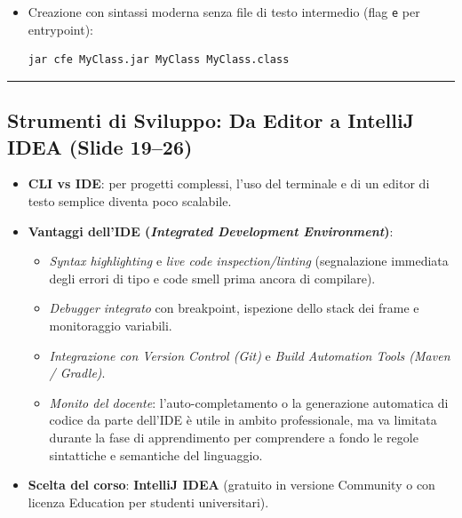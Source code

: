 \documentclass[11pt,a4paper,oneside]{report}
\newcommand{\passthrough}[1]{#1}
\providecommand{\tightlist}{\setlength{\itemsep}{0pt}\setlength{\parskip}{0pt}}
\begin{document}
\begin{itemize}
\begin{itemize}
\begin{lstlisting}[language=bash]
jar cvfm MyClass.jar manifest.txt MyClass.class
\end{lstlisting}
  \item
    Creazione con sintassi moderna senza file di testo intermedio (flag
    \passthrough{\lstinline!e!} per entrypoint):

\begin{lstlisting}[language=bash]
jar cfe MyClass.jar MyClass MyClass.class
\end{lstlisting}
  \end{itemize}
\end{itemize}

\begin{center}\rule{0.5\linewidth}{0.5pt}\end{center}

\subsection{Strumenti di Sviluppo: Da Editor a IntelliJ IDEA (Slide
19--26)}\label{chap03_strumenti-di-sviluppo-da-editor-a-intellij-idea-slide-1926}

\begin{itemize}
\tightlist
\item
  \textbf{CLI vs IDE}: per progetti complessi, l'uso del terminale e di
  un editor di testo semplice diventa poco scalabile.
\item
  \textbf{Vantaggi dell'IDE (\emph{Integrated Development
  Environment})}:

  \begin{itemize}
  \tightlist
  \item
    \emph{Syntax highlighting} e \emph{live code inspection/linting}
    (segnalazione immediata degli errori di tipo e code smell prima
    ancora di compilare).
  \item
    \emph{Debugger integrato} con breakpoint, ispezione dello stack dei
    frame e monitoraggio variabili.
  \item
    \emph{Integrazione con Version Control (Git)} e \emph{Build
    Automation Tools (Maven / Gradle)}.
  \item
    \emph{Monito del docente}: l'auto-completamento o la generazione
    automatica di codice da parte dell'IDE è utile in ambito
    professionale, ma va limitata durante la fase di apprendimento per
    comprendere a fondo le regole sintattiche e semantiche del
    linguaggio.
  \end{itemize}
\item
  \textbf{Scelta del corso}: \textbf{IntelliJ IDEA} (gratuito in
  versione Community o con licenza Education per studenti universitari).
\end{itemize}
\end{document}
